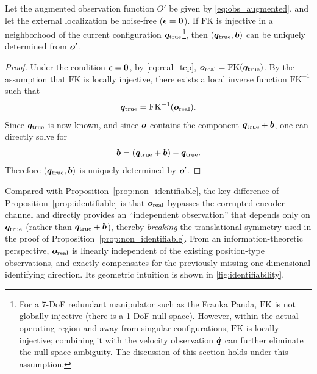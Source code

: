 \begin{proposition}\label{prop:identifiable}
Let the augmented observation function $O'$ be given by \cref{eq:obs_augmented}, and let the external localization be noise-free ($\bm{\epsilon} = \bm{0}$). If $\text{FK}$ is injective in a neighborhood of the current configuration $\bm{q}_{\text{true}}$\footnote{For a 7-DoF redundant manipulator such as the Franka Panda, $\text{FK}$ is not globally injective (there is a 1-DoF null space). However, within the actual operating region and away from singular configurations, $\text{FK}$ is locally injective; combining it with the velocity observation $\dot{\bm{q}}$ can further eliminate the null-space ambiguity. The discussion of this section holds under this assumption.}, then $(\bm{q}_{\text{true}}, \bm{b})$ can be uniquely determined from $\bm{o}'$.
\end{proposition}

\begin{proof}
Under the condition $\bm{\epsilon} = \bm{0}$, by \cref{eq:real_tcp}, $\bm{o}_{\text{real}} = \text{FK}(\bm{q}_{\text{true}})$. By the assumption that $\text{FK}$ is locally injective, there exists a local inverse function $\text{FK}^{-1}$ such that
\begin{equation}
  \bm{q}_{\text{true}} = \text{FK}^{-1}(\bm{o}_{\text{real}}).
  \label{eq:recover_q}
\end{equation}
Since $\bm{q}_{\text{true}}$ is now known, and since $\bm{o}$ contains the component $\bm{q}_{\text{true}} + \bm{b}$, one can directly solve for
\begin{equation}
  \bm{b} = (\bm{q}_{\text{true}} + \bm{b}) - \bm{q}_{\text{true}}.
  \label{eq:recover_b}
\end{equation}
Therefore $(\bm{q}_{\text{true}}, \bm{b})$ is uniquely determined by $\bm{o}'$.\end{proof}

Compared with Proposition~\ref{prop:non_identifiable}, the key difference of Proposition~\ref{prop:identifiable} is that $\bm{o}_{\text{real}}$ bypasses the corrupted encoder channel and directly provides an ``independent observation'' that depends only on $\bm{q}_{\text{true}}$ (rather than $\bm{q}_{\text{true}} + \bm{b}$), thereby \emph{breaking} the translational symmetry used in the proof of Proposition~\ref{prop:non_identifiable}. From an information-theoretic perspective, $\bm{o}_{\text{real}}$ is linearly independent of the existing position-type observations, and exactly compensates for the previously missing one-dimensional identifying direction. Its geometric intuition is shown in \cref{fig:identifiability}.

